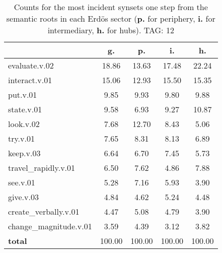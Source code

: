 \begin{table}[h!]
\begin{center}
\begin{tabular}{| l || c | c | c | c |}\hline
 & {\bf g.} & {\bf p.} & {\bf i.} & {\bf h.} \\\hline\hline
evaluate.v.02 & 18.86  & 13.63  & 17.48  & 22.24 \\\hline
interact.v.01 & 15.06  & 12.93  & 15.50  & 15.35 \\\hline
put.v.01 & 9.85  & 9.93  & 9.80  & 9.88 \\\hline
state.v.01 & 9.58  & 6.93  & 9.27  & 10.87 \\\hline
look.v.02 & 7.68  & 12.70  & 8.43  & 5.06 \\\hline
try.v.01 & 7.65  & 8.31  & 8.13  & 6.89 \\\hline
keep.v.03 & 6.64  & 6.70  & 7.45  & 5.73 \\\hline
travel\_rapidly.v.01 & 6.50  & 7.62  & 4.86  & 7.88 \\\hline
see.v.01 & 5.28  & 7.16  & 5.93  & 3.90 \\\hline
give.v.03 & 4.84  & 4.62  & 5.24  & 4.48 \\\hline
create\_verbally.v.01 & 4.47  & 5.08  & 4.79  & 3.90 \\\hline
change\_magnitude.v.01 & 3.59  & 4.39  & 3.12  & 3.82 \\\hline\hline
{{\bf total}} & 100.00  & 100.00  & 100.00  & 100.00 \\\hline
\end{tabular}
\caption{Counts for the most incident synsets one step from the semantic roots in each Erd\"os sector ({\bf p.} for periphery, {\bf i.} for intermediary, {\bf h.} for hubs). TAG: 12}
\end{center}
\end{table}